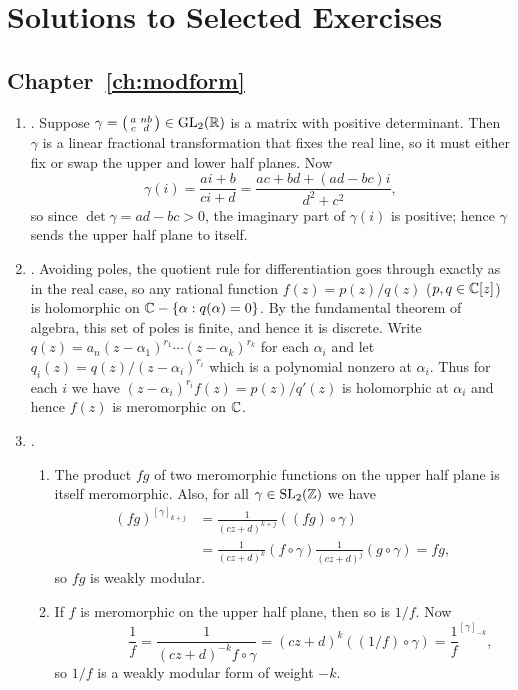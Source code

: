 \chapter{Solutions to Selected Exercises}\label{ch:solutions}
\section{Chapter~\ref{ch:modform}}%
\begin{enumerate}
\item{}.
Suppose $\gamma = \left( \begin{smallmatrix}a&nb\\c&d\end{smallmatrix}\right) \in \operatorname{GL}_2(\mathbb{R})$ is a matrix
with positive determinant.
Then $\gamma$ is a linear fractional transformation that fixes the
real line, so it must either fix or swap the upper and
lower half planes. Now
$$\gamma(i) = \frac{ai+b}{ci+d} = \frac{ac+bd + (ad-bc)i}{d^2+c^2},$$
so since $\det \gamma = ad-bc > 0$, the imaginary part of $\gamma(i)$
is positive; hence $\gamma$ sends the upper half plane to itself.

\item{}.
Avoiding poles, the quotient rule for differentiation goes
  through exactly as in the real case, so any rational
  function $f(z) = p(z)/q(z)$ ($p,q \in \mathbb{C}[z]$) is holomorphic on
  $\mathbb{C}-\{\alpha : q(\alpha) = 0 \}$. By the fundamental theorem of
  algebra, this set of poles is finite, and hence it is discrete.
  Write $q (z) = a_n(z-\alpha_1)^{r_1}\cdots(z-\alpha_k)^{r_k}$ for
  each $\alpha_i$ and let $q_i(z)=q(z)/(z-\alpha_i)^{r_i}$ which is a
  polynomial nonzero at $\alpha_i$. Thus for each $i$ we have
  $(z-\alpha_i)^{r_i}f(z) = p(z)/q'(z)$ is holomorphic at $\alpha_i$
  and hence $f(z)$ is meromorphic on $\mathbb{C}$.

\item {}.
\begin{enumerate}
\item The product $fg$ of two meromorphic functions on the upper half
  plane is itself meromorphic. Also, for all $\gamma \in \operatorname{SL}_2(\mathbb{Z})$
  we have
\begin{align*}
(fg)^{[\gamma]_{k+j}} 
&= \frac{1}{(cz+d)^{k+j}}((fg) \circ \gamma)\\
&= \frac{1}{(cz+d)^k}(f \circ \gamma) \frac{1}{(cz+d)^j}(g \circ \gamma)
= fg,
\end{align*} so $fg$ is weakly modular. 

\item If $f$ is meromorphic on the upper half plane, then so is $1/f$.
 Now
$$
  \qquad\qquad\frac{1}{f} = \frac{1}{(cz+d)^{-k} f \circ \gamma} = (cz+d)^k ((1/f) \circ \gamma) = \frac{1}{f}^{[\gamma]_{-k}},
$$
so $1/f$ is a weakly modular form of weight $-k$. 


\end{enumerate}
\end{enumerate}

